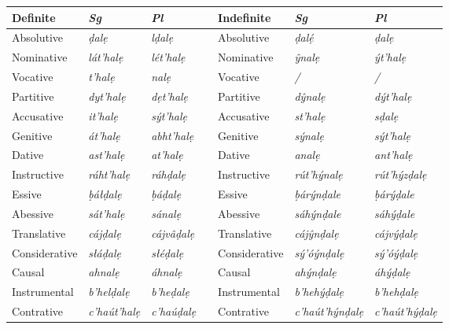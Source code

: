 \documentclass[a4paper, 12pt, twoside, openright, final]{book}
\let \nf \normalfont
\begin{document}
\noindent\begin{longtable}{l|>{\it}l|>{\it}lll|>{\it}l|>{\it}l}
Definite    &\nf Sg&\nf Pl && Indefinite&\nf Sg&\nf Pl\\\cline{1-3}\cline{5-7}
\endhead
Absolutive        & ḍalẹ             & lḍalẹ              && Absolutive      & ḍalẹ́            & ḍalẹ        \\
Nominative        & lát’halẹ         & lét’halẹ           && Nominative      & ŷnalẹ           & ýt’halẹ     \\
Vocative          & t’halẹ           & nalẹ               && Vocative        & /               & /           \\
Partitive         & dyt’halẹ         & dẹt’halẹ           && Partitive       & dŷnalẹ          & dýt’halẹ    \\
Accusative        & it’halẹ          & sýt’halẹ           && Accusative      & st’halẹ         & sḍalẹ       \\
Genitive          & át’halẹ          & abht’halẹ          && Genitive        & sýnalẹ          & sýt’halẹ    \\
Dative            & ast’halẹ         & at’halẹ            && Dative          & analẹ           & ant’halẹ    \\
Instructive       & ráht’halẹ        & ráhḍalẹ            && Instructive     & rút’hýnalẹ      & rút’hýzḍalẹ \\\cline{1-3}\cline{5-7}

Essive            & ḅáłḍalẹ          & ḅáḍalẹ             && Essive          & ḅárýnḍale       & ḅárýḍale    \\
Abessive          & sát’halẹ         & sánalẹ             && Abessive        & sáhýnḍale       & sáhýḍale    \\
Translative       & cájḍalẹ          & cájvâḍalẹ          && Translative     & cájŷnḍalẹ       & cájvýḍalẹ   \\
Considerative     & słáḍalẹ          & słéḍalẹ            && Considerative   & sý’óýnḍalẹ      & sý’óýḍalẹ   \\
Causal            & ahnalẹ           & áhnalẹ             && Causal          & ahýnḍalẹ        & áhýḍalẹ     \\
Instrumental      & b’helḍalẹ        & b’heḍalẹ           && Instrumental    & b’hehýḍalẹ      & b’hehḍalẹ   \\
Contrative        & c’haút’halẹ      & c’haúḍalẹ          && Contrative      & c’haút’hýnḍalẹ  & c’haút’hýḍalẹ \\\cline{1-3}\cline{5-7}


\end{longtable}
\end{document}
